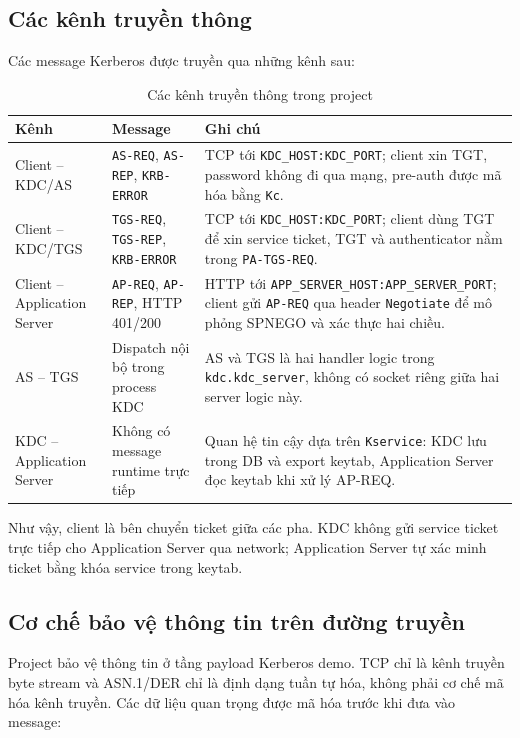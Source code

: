 \documentclass[12pt]{article}
\begin{document}
\subsection{Các kênh truyền thông}

Các message Kerberos được truyền qua những kênh sau:

\begin{table}[H]
\centering
\renewcommand{\arraystretch}{1.25}
\begin{tabularx}{\textwidth}{|p{4.1cm}|p{4.3cm}|X|}
\hline
\textbf{Kênh} & \textbf{Message} & \textbf{Ghi chú} \\
\hline
Client -- KDC/AS & \texttt{AS-REQ}, \texttt{AS-REP}, \texttt{KRB-ERROR} & TCP tới \texttt{KDC\_HOST:KDC\_PORT}; client xin TGT, password không đi qua mạng, pre-auth được mã hóa bằng \texttt{Kc}. \\
\hline
Client -- KDC/TGS & \texttt{TGS-REQ}, \texttt{TGS-REP}, \texttt{KRB-ERROR} & TCP tới \texttt{KDC\_HOST:KDC\_PORT}; client dùng TGT để xin service ticket, TGT và authenticator nằm trong \texttt{PA-TGS-REQ}. \\
\hline
Client -- Application Server & \texttt{AP-REQ}, \texttt{AP-REP}, HTTP 401/200 & HTTP tới \texttt{APP\_SERVER\_HOST:APP\_SERVER\_PORT}; client gửi \texttt{AP-REQ} qua header \texttt{Negotiate} để mô phỏng SPNEGO và xác thực hai chiều. \\
\hline
AS -- TGS & Dispatch nội bộ trong process KDC & AS và TGS là hai handler logic trong \texttt{kdc.kdc\_server}, không có socket riêng giữa hai server logic này. \\
\hline
KDC -- Application Server & Không có message runtime trực tiếp & Quan hệ tin cậy dựa trên \texttt{Kservice}: KDC lưu trong DB và export keytab, Application Server đọc keytab khi xử lý AP-REQ. \\
\hline
\end{tabularx}
\caption{Các kênh truyền thông trong project}
\end{table}

Như vậy, client là bên chuyển ticket giữa các pha. KDC không gửi service ticket trực tiếp cho Application Server qua network; Application Server tự xác minh ticket bằng khóa service trong keytab.

\subsection{Cơ chế bảo vệ thông tin trên đường truyền}

Project bảo vệ thông tin ở tầng payload Kerberos demo. TCP chỉ là kênh truyền byte stream và ASN.1/DER chỉ là định dạng tuần tự hóa, không phải cơ chế mã hóa kênh truyền. Các dữ liệu quan trọng được mã hóa trước khi đưa vào message:
\end{document}
